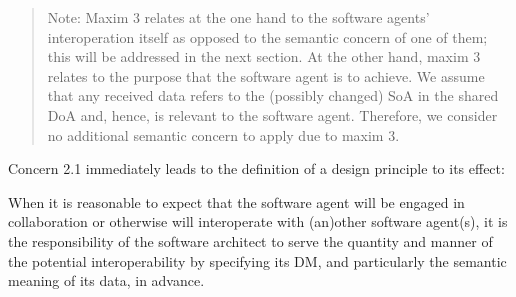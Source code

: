 \documentclass[sort&compress,preprint,authoryear,3p,twocolumn]{elsarticle}
\begin{document}
\begin{quote}
Note: Maxim 3 relates at the one hand to the software agents'
interoperation itself as opposed to the semantic concern of one of them;
this will be addressed in the next section. At the other hand, maxim 3
relates to the purpose that the software agent is to achieve. We assume
that any received data refers to the (possibly changed) SoA in the
shared DoA and, hence, is relevant to the software agent. Therefore, we
consider no additional semantic concern to apply due to maxim 3.
\end{quote}

Concern 2.1 immediately leads to the definition of a design principle to
its effect:

\begin{mmdp}\label{dp:rfsm}

When it is reasonable to expect that the software agent will be engaged in collaboration or otherwise will interoperate with (an)other software agent(s), it is the responsibility of the software architect to serve the quantity and manner of the potential interoperability by specifying its DM, and particularly the semantic meaning of its data, in advance. 


\end{mmdp}
\end{document}
